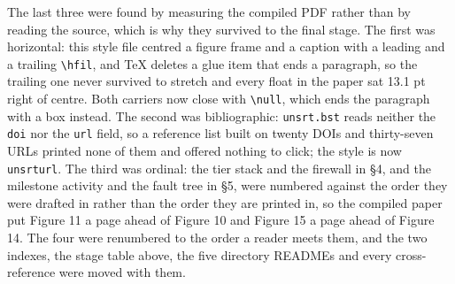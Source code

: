 The last three were found by measuring the compiled PDF rather than by reading
the source, which is why they survived to the final stage. The first was
horizontal: this style file centred a figure frame and a caption with a leading
and a trailing \texttt{\textbackslash hfil}, and TeX deletes a glue item that
ends a paragraph, so the trailing one never survived to stretch and every float
in the paper sat 13.1 pt right of centre. Both carriers now close with
\texttt{\textbackslash null}, which ends the paragraph with a box instead. The
second was bibliographic: \texttt{unsrt.bst} reads neither the \texttt{doi} nor
the \texttt{url} field, so a reference list built on twenty DOIs and thirty-seven
URLs printed none of them and offered nothing to click; the style is now
\texttt{unsrturl}. The third was ordinal: the tier stack and the firewall in
\S4, and the milestone activity and the fault tree in \S5, were numbered against
the order they were drafted in rather than the order they are printed in, so the
compiled paper put Figure 11 a page ahead of Figure 10 and Figure 15 a page
ahead of Figure 14. The four were renumbered to the order a reader meets them,
and the two indexes, the stage table above, the five directory READMEs and every
cross-reference were moved with them.
